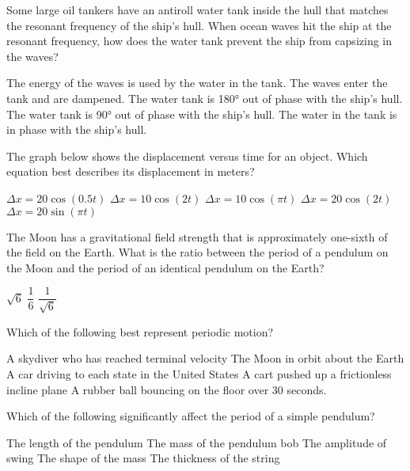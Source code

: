 \documentclass{../../../oss-ap12ibhl}
\begin{document}
\begin{questions}
  \question Some large oil tankers have an antiroll water tank inside the hull
  that matches the resonant frequency of the ship’s hull. When ocean waves hit
  the ship at the resonant frequency, how does the water tank prevent the ship
  from capsizing in the waves?
  \begin{choices}
    \choice The energy of the waves is used by the water in the tank.
    \choice The waves enter the tank and are dampened.
    \choice The water tank is \ang{180} out of phase with the ship's hull.
    \choice The water tank is \ang{90} out of phase with the ship's hull.
    \choice The water in the tank is in phase with the ship's hull.
  \end{choices}
    
  \question The graph below shows the displacement versus time for an object.
  Which equation best describes its displacement in meters?
  \begin{choices}
    \choice $\Delta x=20\cos(0.5t)$
    \choice $\Delta x=10\cos(2t)$
    \choice $\Delta x=10\cos(\pi t)$
    \choice $\Delta x=20\cos(2t)$
    \choice $\Delta x=20\sin(\pi t)$
  \end{choices}
    
  \question The Moon has a gravitational field strength that is approximately
  one-sixth of the field on the Earth. What is the ratio between the period
  of a pendulum on the Moon and the period of an identical pendulum on the
  Earth?
  \begin{choices}
    \choice $\sqrt{6}$
    \choice $\dfrac16$
    \choice $\dfrac1{\sqrt6}$
  \end{choices}

  \question Which of the following best represent periodic motion?
  \begin{choices}
    \choice A skydiver who has reached terminal velocity
    \choice The Moon in orbit about the Earth
    \choice A car driving to each state in the United States
    \choice A cart pushed up a frictionless incline plane
    \choice A rubber ball bouncing on the floor over 30 seconds.
  \end{choices}
    
  \question Which of the following significantly affect the period of a simple
  pendulum?
  \begin{choices}
    \choice The length of the pendulum
    \choice The mass of the pendulum bob
    \choice The amplitude of swing
    \choice The shape of the mass
    \choice The thickness of the string
  \end{choices}


\end{questions}
\end{document}
